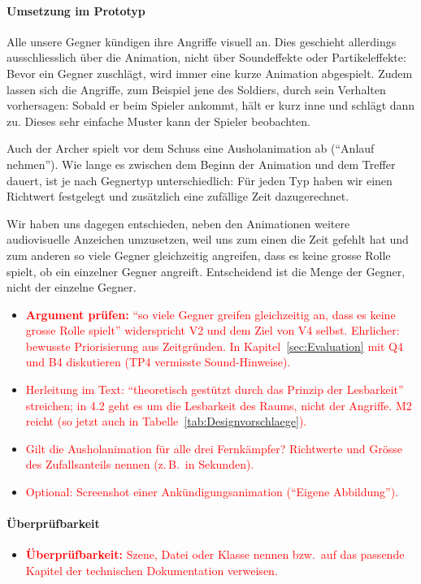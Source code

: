 \documentclass[../Main.tex]{subfiles}
\begin{document}
\paragraph{Umsetzung im Prototyp}
Alle unsere Gegner kündigen ihre Angriffe visuell an. Dies geschieht allerdings ausschliesslich über die Animation, nicht über Soundeffekte oder Partikeleffekte: Bevor ein Gegner zuschlägt, wird immer eine kurze Animation abgespielt. Zudem lassen sich die Angriffe, zum Beispiel jene des Soldiers, durch sein Verhalten vorhersagen: Sobald er beim Spieler ankommt, hält er kurz inne und schlägt dann zu. Dieses sehr einfache Muster kann der Spieler beobachten.

Auch der Archer spielt vor dem Schuss eine Ausholanimation ab (\enquote{Anlauf nehmen}). Wie lange es zwischen dem Beginn der Animation und dem Treffer dauert, ist je nach Gegnertyp unterschiedlich: Für jeden Typ haben wir einen Richtwert festgelegt und zusätzlich eine zufällige Zeit dazugerechnet.

Wir haben uns dagegen entschieden, neben den Animationen weitere audiovisuelle Anzeichen umzusetzen, weil uns zum einen die Zeit gefehlt hat und zum anderen so viele Gegner gleichzeitig angreifen, dass es keine grosse Rolle spielt, ob ein einzelner Gegner angreift. Entscheidend ist die Menge der Gegner, nicht der einzelne Gegner.

\begin{itemize}[leftmargin=1.5cm]
    \item \textcolor{red}{\textbf{Argument prüfen:} \enquote{so viele Gegner greifen gleichzeitig an, dass es keine grosse Rolle spielt} widerspricht V2 und dem Ziel von V4 selbst. Ehrlicher: bewusste Priorisierung aus Zeitgründen. In Kapitel~\ref{sec:Evaluation} mit Q4 und B4 diskutieren (TP4 vermisste Sound-Hinweise).}
    \item \textcolor{red}{Herleitung im Text: \enquote{theoretisch gestützt durch das Prinzip der Lesbarkeit} streichen; in 4.2 geht es um die Lesbarkeit des Raums, nicht der Angriffe.  M2 reicht (so jetzt auch in Tabelle~\ref{tab:Designvorschlaege}).}
    \item \textcolor{red}{Gilt die Ausholanimation für alle drei Fernkämpfer? Richtwerte und Grösse des Zufallsanteils nennen (z.\,B.\ in Sekunden).}
    \item \textcolor{red}{Optional: Screenshot einer Ankündigungsanimation (\enquote{Eigene Abbildung}).}
\end{itemize}

\paragraph{Überprüfbarkeit}
\begin{itemize}[leftmargin=1.5cm]
    \item \textcolor{red}{\textbf{Überprüfbarkeit:} Szene, Datei oder Klasse nennen bzw.\ auf das passende Kapitel der technischen Dokumentation verweisen.}
\end{itemize}
\end{document}
